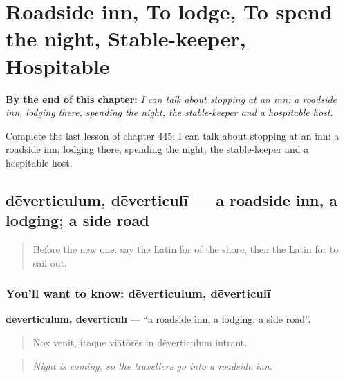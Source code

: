 
\chapter{Roadside inn, To lodge, To spend the night, Stable-keeper, Hospitable}
\label{ch:la-roadside-inn-to-lodge-to-spend-the-night-stable-keeper-hospitable}

\begin{chapteropening}
\textbf{By the end of this chapter:} \emph{I can talk about stopping at an inn: a roadside inn, lodging there, spending the night, the stable-keeper and a hospitable host.}

Complete the last lesson of chapter 445: I can talk about stopping at an inn: a roadside inn, lodging there, spending the night, the stable-keeper and a hospitable host.
\end{chapteropening}

\section[dēverticulum, dēverticulī]{dēverticulum, dēverticulī — a roadside inn, a lodging; a side road}

\label{lesson:LA-C445-deverticulum}



\begin{quote}
Before the new one: say the Latin for of the shore, then the Latin for to sail out.
\end{quote}

\subsection*{You'll want to know: dēverticulum, dēverticulī}
\textbf{dēverticulum, dēverticulī} — \textquotedblleft{}a roadside inn, a lodging; a side road\textquotedblright{}.

\begin{quote}
Nox venit, itaque viātōrēs in dēverticulum intrant.
\end{quote}

\begin{quote}
\emph{Night is coming, so the travellers go into a roadside inn.}
\end{quote}

